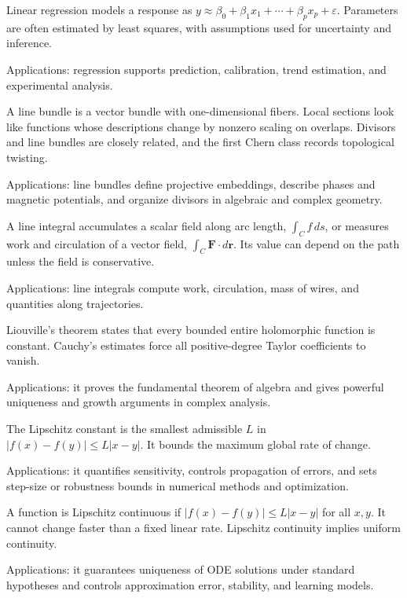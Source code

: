 Linear regression models a response as $y\approx\beta_0+\beta_1x_1+\cdots+\beta_px_p+\varepsilon$. Parameters are often estimated by least squares, with assumptions used for uncertainty and inference. \par\noindent Applications: regression supports prediction, calibration, trend estimation, and experimental analysis.

A line bundle is a vector bundle with one-dimensional fibers. Local sections look like functions whose descriptions change by nonzero scaling on overlaps. Divisors and line bundles are closely related, and the first Chern class records topological twisting. \par\noindent Applications: line bundles define projective embeddings, describe phases and magnetic potentials, and organize divisors in algebraic and complex geometry.

A line integral accumulates a scalar field along arc length, $\int_Cf\,ds$, or measures work and circulation of a vector field, $\int_C\mathbf F\cdot d\mathbf r$. Its value can depend on the path unless the field is conservative. \par\noindent Applications: line integrals compute work, circulation, mass of wires, and quantities along trajectories.

Liouville's theorem states that every bounded entire holomorphic function is constant. Cauchy's estimates force all positive-degree Taylor coefficients to vanish. \par\noindent Applications: it proves the fundamental theorem of algebra and gives powerful uniqueness and growth arguments in complex analysis.

The Lipschitz constant is the smallest admissible $L$ in $|f(x)-f(y)|\leq L|x-y|$. It bounds the maximum global rate of change. \par\noindent Applications: it quantifies sensitivity, controls propagation of errors, and sets step-size or robustness bounds in numerical methods and optimization.

A function is Lipschitz continuous if $|f(x)-f(y)|\leq L|x-y|$ for all $x,y$. It cannot change faster than a fixed linear rate. Lipschitz continuity implies uniform continuity. \par\noindent Applications: it guarantees uniqueness of ODE solutions under standard hypotheses and controls approximation error, stability, and learning models.

